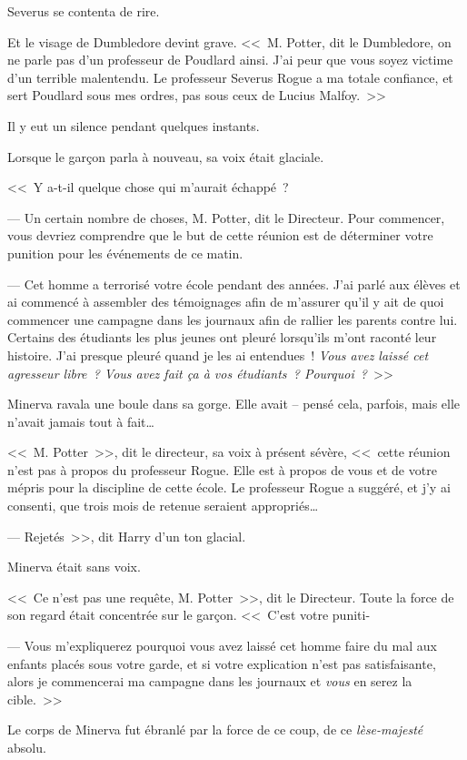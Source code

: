 Severus se contenta de rire.

Et le visage de Dumbledore devint grave. <<~M. Potter, dit le Dumbledore, on ne parle pas d'un professeur de Poudlard ainsi. J'ai peur que vous soyez victime d'un terrible malentendu. Le professeur Severus Rogue a ma totale confiance, et sert Poudlard sous mes ordres, pas sous ceux de Lucius Malfoy.~>>

Il y eut un silence pendant quelques instants.

Lorsque le garçon parla à nouveau, sa voix était glaciale.

<<~Y a-t-il quelque chose qui m'aurait échappé~?

--- Un certain nombre de choses, M. Potter, dit le Directeur. Pour commencer, vous devriez comprendre que le but de cette réunion est de déterminer votre punition pour les événements de ce matin.

--- Cet homme a terrorisé votre école pendant des années. J'ai parlé aux élèves et ai commencé à assembler des témoignages afin de m'assurer qu'il y ait de quoi commencer une campagne dans les journaux afin de rallier les parents contre lui. Certains des étudiants les plus jeunes ont pleuré lorsqu'ils m'ont raconté leur histoire. J'ai presque pleuré quand je les ai entendues~! \emph{Vous avez laissé cet agresseur libre~? Vous avez fait ça à vos étudiants~? Pourquoi~?}~>>

Minerva ravala une boule dans sa gorge. Elle avait -- pensé cela, parfois, mais elle n'avait jamais tout à fait…

<<~M. Potter~>>, dit le directeur, sa voix à présent sévère, <<~cette réunion n'est pas à propos du professeur Rogue. Elle est à propos de vous et de votre mépris pour la discipline de cette école. Le professeur Rogue a suggéré, et j'y ai consenti, que trois mois de retenue seraient appropriés…

--- Rejetés~>>, dit Harry d'un ton glacial.

Minerva était sans voix.

<<~Ce n'est pas une requête, M. Potter~>>, dit le Directeur. Toute la force de son regard était concentrée sur le garçon. <<~C'est votre puniti-

--- Vous m'expliquerez pourquoi vous avez laissé cet homme faire du mal aux enfants placés sous votre garde, et si votre explication n'est pas satisfaisante, alors je commencerai ma campagne dans les journaux et \emph{vous} en serez la cible.~>>

Le corps de Minerva fut ébranlé par la force de ce coup, de ce \emph{lèse-majesté} absolu.

